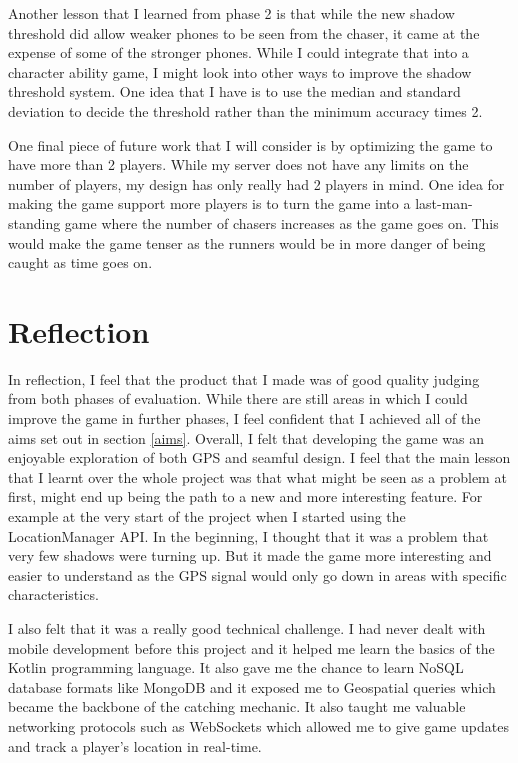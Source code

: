 \documentclass{l4proj}
\begin{document}
Another lesson that I learned from phase 2 is that while the new shadow threshold did allow weaker phones to
be seen from the chaser, it came at the expense of some of the stronger phones. While I could integrate
that into a character ability game, I might look into other ways to improve the shadow threshold system. One
idea that I have is to use the median and standard deviation to decide the threshold rather than the minimum
accuracy times 2.

One final piece of future work that I will consider is by optimizing the game to have more than 2 players. While
my server does not have any limits on the number of players, my design has only really had 2 players in mind.
One idea for making the game support more players is to turn the game into a last-man-standing game where
the number of chasers increases as the game goes on. This would make the game tenser as the runners would 
be in more danger of being caught as time goes on.

\section{Reflection}
In reflection, I feel that the product that I made was of good quality judging from both phases of evaluation. While
there are still areas in which I could improve the game in further phases, I feel confident that I achieved all of the
aims set out in section \ref{aims}. Overall, I felt that developing the game was an enjoyable exploration of both GPS
and seamful design. I feel that the main lesson that I learnt over the whole project was that what might be seen as a
problem at first, might end up being the path to a new and more interesting feature. For example at the very start of
the project when I started using the LocationManager API. In the beginning, I thought that it was a problem that very
few shadows were turning up. But it made the game more interesting and easier to understand as the GPS signal would only
go down in areas with specific characteristics.

I also felt that it was a really good technical challenge. I had never dealt with mobile development before
this project and it helped me learn the basics of the Kotlin programming language. It also gave me the chance to 
learn NoSQL database formats like MongoDB and it exposed me to Geospatial queries which became the backbone of the
catching mechanic. It also taught me valuable networking protocols such as WebSockets which allowed me to give game
updates and track a player's location in real-time.
\end{document}
